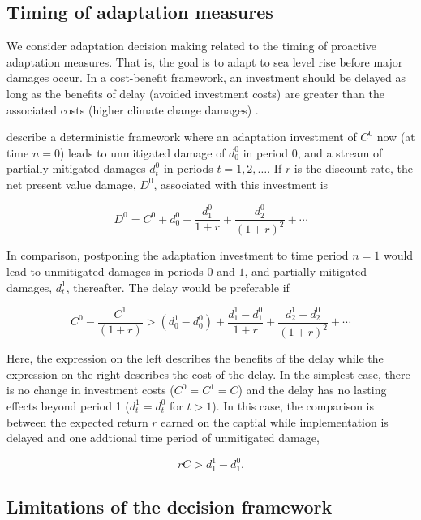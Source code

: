 \documentclass[wrr, draft]{agutex}
\begin{document}
\begin{article}
\subsection{Timing of adaptation measures}

We consider adaptation decision making related to the timing of proactive adaptation measures. That is, the goal is to adapt to sea level rise before major damages occur. In a cost-benefit framework, an investment should be delayed as long as the benefits of delay (avoided investment costs) are greater than the associated costs (higher climate change damages) \citep{Fankhauser&1999}.

\cite{Fankhauser&1999} describe a deterministic framework where an adaptation investment of $C^0$ now (at time $n=0$) leads to unmitigated damage of $d_0^0$ in period $0$, and a stream of partially mitigated damages $d_t^0$ in periods $t=1,2,\ldots$. If $r$ is the discount rate, the net present value damage, $D^0$, associated with this investment is
\begin{linenomath*}
\begin{equation}\label{eq:deterministic damage}
D^0 = C^0 + d_0^0 + \frac{d_1^0}{1+r} + \frac{d_2^0}{(1+r)^2} + \cdots  
\end{equation}
\end{linenomath*}
In comparison, postponing the adaptation investment to time period $n=1$ would lead to unmitigated damages in periods $0$ and $1$, and partially mitigated damages, $d_t^1$, thereafter. The delay would be preferable if
\begin{linenomath*}
\[
C^0 - \frac{C^1}{(1+r)} > (d_0^1 - d_0^0) + \frac{d_1^1 - d_1^0}{1+r} + \frac{d_2^1 - d_2^0}{(1+r)^2} + \cdots
\]
\end{linenomath*}
Here, the expression on the left describes the benefits of the delay while the expression on the right describes the cost of the delay. In the simplest case, there is no change in investment costs ($C^0 = C^1 = C$) and the delay has no lasting effects beyond period 1 ($d_t^1 = d_t^0$ for $t > 1$). In this case, the comparison is between the expected return $r$ earned on the captial while implementation is delayed and one addtional time period of unmitigated damage,
\begin{linenomath*}
  \[
  r C > d_1^1 - d_1^0.
  \]
  \end{linenomath*}

\subsection{Limitations of the decision framework}


\end{article}
\end{document}
